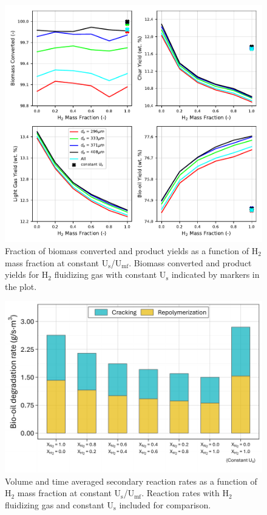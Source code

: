 \documentclass{article}
\begin{document}
\begin{figure}[H]
    \centering
    \includegraphics[width=\textwidth]{figures/cfd-constuumf-yields.pdf}
    \caption{Fraction of biomass converted and product yields as a function of H$_2$ mass fraction at constant U$_\text{s}$/U$_\text{mf}$. Biomass converted and product yields for H$_2$ fluidizing gas with constant U$_\text{s}$ indicated by markers in the plot.}
    \label{fig:cfd-constuumf-yields}
\end{figure}

\begin{figure}[H]
    \centering
    \includegraphics[width=1.0\textwidth]{figures/cfd-constuumf-reaction-rates.pdf}
    \caption{Volume and time averaged secondary reaction rates as a function of H$_2$ mass fraction at constant U$_\text{s}$/U$_\text{mf}$. Reaction rates with H$_2$ fluidizing gas and constant U$_\text{s}$ included for comparison.}
    \label{fig:cfd-constuumf-reaction-rates}
\end{figure}
\end{document}
